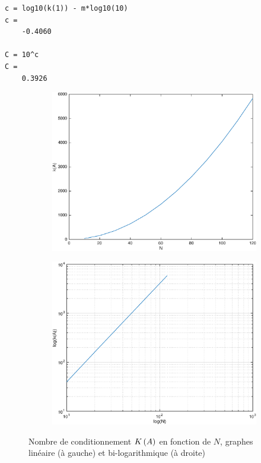 \begin{enumerate}[label=\alph*)]
\begin{verbatim}
c = log10(k(1)) - m*log10(10)
c = 
    -0.4060
    
C = 10^c
C =
    0.3926
\end{verbatim} 

\begin{figure}[h!]
  \begin{subfigure}[b]{0.5\linewidth}
    \centering
    \includegraphics[scale=0.4]{s3/matlab/ex2_lin} 
  \end{subfigure}
  \begin{subfigure}[b]{0.5\linewidth}
    \centering
    \includegraphics[scale=0.4]{s3/matlab/ex2_log} 
  \end{subfigure} 
  \caption{Nombre de conditionnement $K \left(A\right)$ en fonction de $N$, graphes linéaire (à gauche) et bi-logarithmique (à droite)}
  \label{fig:cond}
\end{figure}


\end{enumerate}
